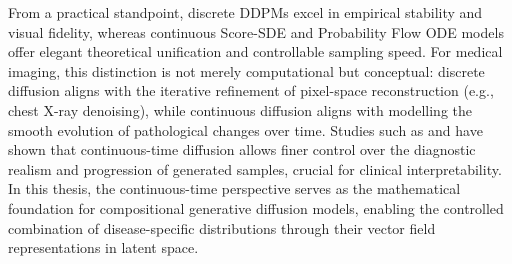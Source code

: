From a practical standpoint, discrete DDPMs excel in empirical stability and visual fidelity, whereas continuous Score-SDE and Probability Flow ODE models offer elegant theoretical unification and controllable sampling speed. For medical imaging, this distinction is not merely computational but conceptual: discrete diffusion aligns with the iterative refinement of pixel-space reconstruction (e.g., chest X-ray denoising), while continuous diffusion aligns with modelling the smooth evolution of pathological changes over time. Studies such as \cite{wolleb2022sddpm} and \cite{dorj2023ddpm_ct} have shown that continuous-time diffusion allows finer control over the diagnostic realism and progression of generated samples, crucial for clinical interpretability. In this thesis, the continuous-time perspective serves as the mathematical foundation for compositional generative diffusion models, enabling the controlled combination of disease-specific distributions through their vector field representations in latent space.  

